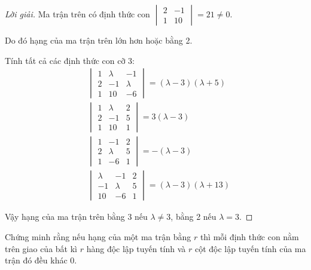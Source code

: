 \documentclass[class=linear-algebra,crop=false]{standalone}
\begin{document}
\begin{proof}[Lời giải]
	\par Ma trận trên có định thức con $\begin{vmatrix}2 & -1 \\ 1 & 10\end{vmatrix} = 21 \ne 0$.
	\par Do đó hạng của ma trận trên lớn hơn hoặc bằng 2.
	\par Tính tất cả các định thức con cỡ 3:
	\begin{align*}
		 & \begin{vmatrix}
			   1 & \lambda & -1      \\
			   2 & -1      & \lambda \\
			   1 & 10      & -6
		   \end{vmatrix} = (\lambda - 3)(\lambda + 5)  \\
		 & \begin{vmatrix}
			   1 & \lambda & 2 \\
			   2 & -1      & 5 \\
			   1 & 10      & 1
		   \end{vmatrix} = 3(\lambda - 3)              \\
		 & \begin{vmatrix}
			   1 & -1      & 2 \\
			   2 & \lambda & 5 \\
			   1 & -6      & 1
		   \end{vmatrix} = -(\lambda - 3)              \\
		 & \begin{vmatrix}
			   \lambda & -1      & 2 \\
			   -1      & \lambda & 5 \\
			   10      & -6      & 1
		   \end{vmatrix} = (\lambda - 3)(\lambda + 13)
	\end{align*}
	\par Vậy hạng của ma trận trên bằng 3 nếu $\lambda \ne 3$, bằng 2 nếu $\lambda = 3$.
\end{proof}

\begin{exercise}
	\par Chứng minh rằng nếu hạng của một ma trận bằng $r$ thì mỗi định thức con nằm trên giao của bất kì $r$ hàng độc lập tuyến tính và $r$ cột độc lập tuyến tính của ma trận đó đều khác 0.
\end{exercise}
\end{document}
